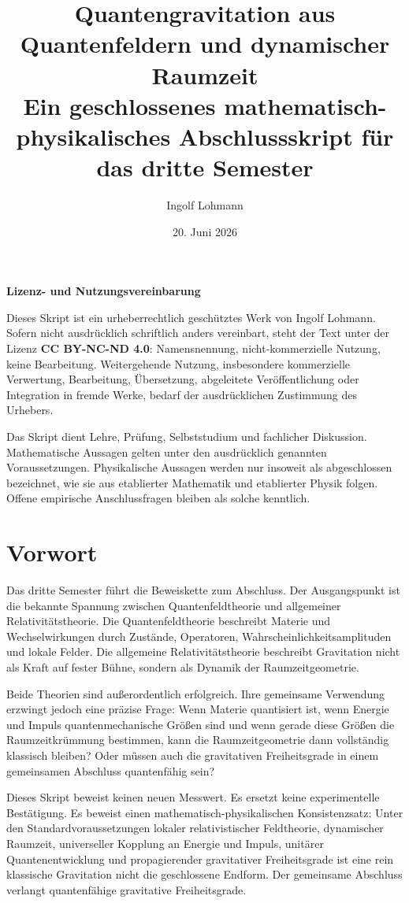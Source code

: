 \documentclass[11pt,a4paper,openany]{book}
\title{\Huge Quantengravitation aus Quantenfeldern und dynamischer Raumzeit\\[0.5em]\Large Ein geschlossenes mathematisch-physikalisches Abschlussskript für das dritte Semester}
\author{Ingolf Lohmann}
\date{20. Juni 2026}
\theoremstyle{remark}
\begin{document}
\frontmatter
\maketitle
\thispagestyle{empty}
\vspace*{1.6cm}
\begin{center}
\textbf{Lizenz- und Nutzungsvereinbarung}
\end{center}
Dieses Skript ist ein urheberrechtlich geschütztes Werk von Ingolf Lohmann. Sofern nicht ausdrücklich schriftlich anders vereinbart, steht der Text unter der Lizenz \textbf{CC BY-NC-ND 4.0}: Namensnennung, nicht-kommerzielle Nutzung, keine Bearbeitung. Weitergehende Nutzung, insbesondere kommerzielle Verwertung, Bearbeitung, Übersetzung, abgeleitete Veröffentlichung oder Integration in fremde Werke, bedarf der ausdrücklichen Zustimmung des Urhebers.

Das Skript dient Lehre, Prüfung, Selbststudium und fachlicher Diskussion. Mathematische Aussagen gelten unter den ausdrücklich genannten Voraussetzungen. Physikalische Aussagen werden nur insoweit als abgeschlossen bezeichnet, wie sie aus etablierter Mathematik und etablierter Physik folgen. Offene empirische Anschlussfragen bleiben als solche kenntlich.

\tableofcontents
\mainmatter

\chapter*{Vorwort}
Das dritte Semester führt die Beweiskette zum Abschluss. Der Ausgangspunkt ist die bekannte Spannung zwischen Quantenfeldtheorie und allgemeiner Relativitätstheorie. Die Quantenfeldtheorie beschreibt Materie und Wechselwirkungen durch Zustände, Operatoren, Wahrscheinlichkeitsamplituden und lokale Felder. Die allgemeine Relativitätstheorie beschreibt Gravitation nicht als Kraft auf fester Bühne, sondern als Dynamik der Raumzeitgeometrie.

Beide Theorien sind außerordentlich erfolgreich. Ihre gemeinsame Verwendung erzwingt jedoch eine präzise Frage: Wenn Materie quantisiert ist, wenn Energie und Impuls quantenmechanische Größen sind und wenn gerade diese Größen die Raumzeitkrümmung bestimmen, kann die Raumzeitgeometrie dann vollständig klassisch bleiben? Oder müssen auch die gravitativen Freiheitsgrade in einem gemeinsamen Abschluss quantenfähig sein?

Dieses Skript beweist keinen neuen Messwert. Es ersetzt keine experimentelle Bestätigung. Es beweist einen mathematisch-physikalischen Konsistenzsatz: Unter den Standardvoraussetzungen lokaler relativistischer Feldtheorie, dynamischer Raumzeit, universeller Kopplung an Energie und Impuls, unitärer Quantenentwicklung und propagierender gravitativer Freiheitsgrade ist eine rein klassische Gravitation nicht die geschlossene Endform. Der gemeinsame Abschluss verlangt quantenfähige gravitative Freiheitsgrade.
\end{document}
